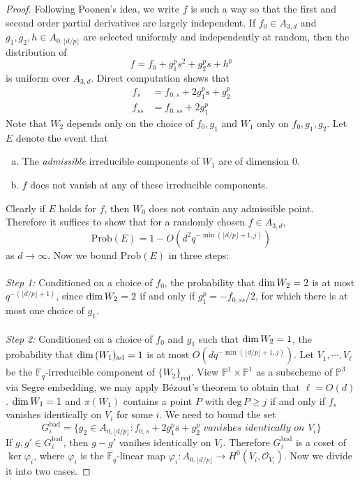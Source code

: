 \documentclass[12pt]{article}
\theoremstyle{plain}
\theoremstyle{definition}
\newcommand{\IF}{\mathbb{F}}
\newcommand{\IP}{\mathbb{P}}
\newcommand{\sO}{\mathcal{O}}
\renewcommand{\deg}{\mathrm{deg}\,}
\renewcommand\dim{{\rm dim\,}}
\newcommand{\<}{\langle}
\renewcommand{\>}{\rangle}
\newcommand{\Prob}{\mathrm{Prob}}
\begin{document}
\begin{proof}
Following Poonen's idea, we write $f$ is such a way so that the first and second order partial derivatives are largely independent. If $f_0 \in A_{3, d}$ and $g_1, g_2, h \in A_{0, \lfloor d/p \rfloor}$ are selected uniformly and independently at random, then the distribution of 
$$ f = f_0 + g_1^p s^2 + g_2^p s + h^p $$
is uniform over $A_{3, d}$. 
Direct computation shows that 
\begin{align*}
f_s &= f_{0, s} + 2 g_1^p s + g_2^p\\
f_{ss} &= f_{0, ss} + 2 g_1^p 
\end{align*} 
Note that $W_2$ depends only on the choice of $f_0, g_1$ and $W_1$ only on $f_0, g_1, g_2$. Let $E$ denote the event that 
\begin{enumerate}[a.]
\item The \textit{admissible} irreducible components of $W_1$ are of dimension $0$. 
\item $f$ does not vanish at any of these irreducible components. 
\end{enumerate} 
Clearly if $E$ holds for $f$, then $W_0$ does not contain any admissible point. Therefore it suffices to show that for a randomly chosen $f \in A_{3, d}$, 
$$ \Prob(E) = 1 - O(d^2 q^{- \min(\lfloor d/p \rfloor + 1, j)})  $$
as $d \to \infty$. Now we bound $\Prob(E)$ in three steps: \\\\
\textit{Step 1: }Conditioned on a choice of $f_0$, the probability that $\dim W_2 = 2$ is at most $q^{- (\lfloor d/p \rfloor + 1)}$, since $\dim W_2 = 2$ if and only if $g_1^p = - f_{0, ss}/2$, for which there is at most one choice of $g_1$. \\\\
\textit{Step 2: }Conditioned on a choice of $f_0$ and $g_1$ such that $\dim W_2 = 1$, the probability that $\dim (W_1)_{\mathrm{ad}} = 1$ is at most $O(d q^{- \min(\lfloor d/p \rfloor + 1, j)})$. Let $V_1, \cdots, V_\ell$ be the $\IF_q$-irreducible component of $\{W_2 \}_{\mathrm{red}}$. View $\IP^1 \times \IP^1$ as a subscheme of $\IP^3$ via Segre embedding, we may apply B{\'e}zout's theorem to obtain that $\ell = O(d)$. $\dim W_1 = 1$ and $\pi(W_1)$ contains a point $P$ with $\deg P \ge j$ if and only if $f_s$ vanishes identically on $V_i$ for some $i$. We need to bound the set
$$ G^{\mathrm{bad}}_i = \{ g_2 \in A_{0, \lfloor d/p \rfloor} : f_{0, s} + 2 g_1^p s + g_2^p \textit{ vanishes identically on }V_i \} $$
If $g, g' \in G^{\mathrm{bad}}_i$, then $g - g'$ vanihes identically on $V_i$. Therefore $G^{\mathrm{bad}}_i$ is a coset of $\ker \varphi_i$, where $\varphi_i$ is the $\IF_q$-linear map $\varphi_i : A_{0, \lfloor d/p \rfloor} \to H^0(V_i, \sO_{V_i})$. Now we divide it into two cases. 


\end{proof}
\end{document}
